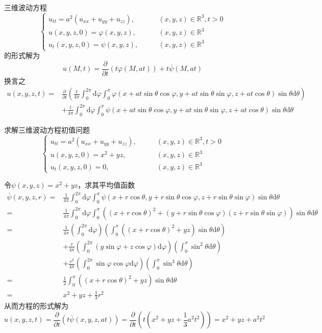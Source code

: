 \documentclass[lang = cn, scheme = chinese, thmcnt = section]{elegantbook}
\newcommand{\R}{\mathbb{R}}            %
\newcommand{\dd}{\mathrm{d}}           %
\begin{document}
\begin{proposition}
	三维波动方程
	$$
	\begin{cases}
		u_{tt}=a^2(u_{xx}+u_{yy}+u_{zz}),\qquad & (x,y,z)\in \R^3,t>0\\
		u(x,y,z,0)=\varphi(x,y,z),\qquad & (x,y,z)\in \R^3\\
		u_t(x,y,z,0)=\psi(x,y,z),\qquad & (x,y,z)\in \R^3
	\end{cases}
	$$
	的形式解为%
	$$
	u(M,t)
	=\frac{\partial}{\partial t}(t\overline{\varphi}(M,at))
	+t\overline{\psi}(M,at)
	$$
	换言之
	\begin{align*}
		u(x,y,z,t)
		= & \frac{\partial}{\partial t}\left(\frac{t}{4\pi}\int_{0}^{2\pi}\dd\varphi\int_{0}^{\pi}\varphi(x+at\sin\theta\cos\varphi,y+at\sin\theta\sin\varphi,z+at\cos\theta)\sin\theta\dd\theta\right)\\
		& + \frac{t}{4\pi}\int_{0}^{2\pi}\dd\varphi\int_{0}^{\pi}\psi(x+at\sin\theta\cos\varphi,y+at\sin\theta\sin\varphi,z+at\cos\theta)\sin\theta\dd\theta
	\end{align*}
\end{proposition}

\begin{example}
	求解三维波动方程初值问题
	$$
	\begin{cases}
		u_{tt}=a^2(u_{xx}+u_{yy}+u_{zz}),\qquad & (x,y,z)\in \R^3,t>0\\
		u(x,y,z,0)=x^2+yz,\qquad & (x,y,z)\in \R^3\\
		u_t(x,y,z,0)=0,\qquad & (x,y,z)\in \R^3
	\end{cases}
	$$
\end{example}

\begin{solution}
	令$\psi(x,y,z)=x^2+yz$，求其平均值函数%
	\begin{align*}
		\overline{\psi}(x,y,z,r)
		= & \frac{1}{4\pi}\int_{0}^{2\pi}\dd\varphi\int_{0}^{\pi}
		\psi(x+r\cos\theta,y+r\sin\theta\cos\varphi,z+r\sin\theta\sin\varphi)\sin\theta\dd\theta\\
		= &  \frac{1}{4\pi}\int_{0}^{2\pi}\dd\varphi\int_{0}^{\pi}((x+r\cos\theta)^2+(y+r\sin\theta\cos\varphi)(z+r\sin\theta\sin\varphi))
		\sin\theta\dd\theta\\
		= &  \frac{1}{4\pi}\left(\int_{0}^{2\pi}\dd\varphi\right)\left(\int_{0}^{\pi}((x+r\cos\theta)^2+yz)\sin\theta\dd\theta\right)\\
		& +  \frac{r}{4\pi}\left(\int_{0}^{2\pi}(y\sin\varphi+z\cos\varphi)\dd\varphi\right)\left(\int_{0}^{\pi}\sin^2\theta\dd\theta\right)\\
		& +  \frac{r^2}{4\pi}\left(\int_{0}^{2\pi}\sin\varphi\cos\varphi\dd\varphi\right)\left(\int_{0}^{\pi}\sin^3\theta\dd\theta\right)\\
		= &  \frac{1}{2}\int_{0}^{\pi}((x+r\cos\theta)^2+yz)\sin\theta\dd\theta\\
		= & x^2+yz+\frac{1}{3}r^2
	\end{align*}
	从而方程的形式解为%
	$$
	u(x,y,z,t)
	=\frac{\partial}{\partial t}\left(t\overline{\psi}(x,y,z,at)\right)
	=\frac{\partial}{\partial t}\left(t\left(x^2+yz+\frac{1}{3}a^2t^2\right)\right)
	=x^2+yz+a^2t^2
	$$
\end{solution}
\end{document}
